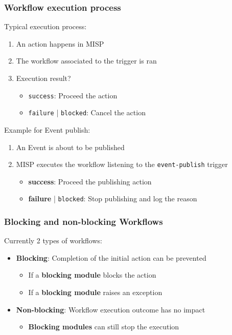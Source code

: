 \begin{frame}
    \frametitle{Workflow execution process}
    Typical execution process:
    \begin{enumerate}
        \item An action happens in MISP
        \item The workflow associated to the trigger is ran
        \item Execution result?
        \begin{itemize}
            \item \texttt{\color{green!50!black}success}: Proceed the action
            \item \texttt{\color{red}failure} | \texttt{\color{blue}blocked}: Cancel the action
        \end{itemize}
    \end{enumerate}
    \vspace{0.5em}
    Example for Event publish:
    \begin{enumerate}
        \item An Event is about to be published
        \item MISP executes the workflow listening to the \texttt{event-publish} trigger
        \begin{itemize}
            \item {\bf\color{green!50!black}success}: Proceed the publishing action
            \item {\bf\color{red}failure} | \texttt{\color{blue}blocked}: Stop publishing and log the reason
        \end{itemize}
    \end{enumerate}
\end{frame}

\begin{frame}
    \frametitle{Blocking and non-blocking Workflows}
    Currently 2 types of workflows:
    \vspace{0.5em}
    \begin{itemize}
        \item {\bf Blocking}: Completion of the initial action can be prevented
        \begin{itemize}
            \item If a \textbf{blocking module} blocks the action
            \item If a \textbf{blocking module} raises an exception
        \end{itemize}
        \vspace{0.5em}
        \item {\bf Non-blocking}: Workflow execution outcome has no impact
        \begin{itemize}
            \item \textbf{Blocking modules} can still stop the execution
        \end{itemize}
    \end{itemize}
\end{frame}

